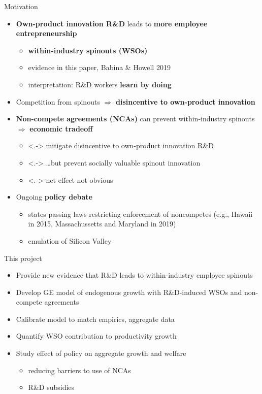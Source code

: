\documentclass[english,usenames,dvipsnames]{beamer}
\begin{document}
\begin{frame}{Motivation}\label{motivation}
\begin{itemize}
	\item<+-> \alert{\textbf{Own-product innovation R\&D}} leads to \alert{\textbf{more employee entrepreneurship}}
	\begin{itemize}
		\item \alert{\textbf{within-industry spinouts (WSOs)}}
		\hyperlink{spinouts_examples}{} \hyperlink{spinouts_facts_from_literature}{} 
		\item evidence in this paper, Babina \& Howell 2019
		\item interpretation: R\&D workers \alert{\textbf{learn by doing}} 
	\end{itemize}
	\smallskip
	\item<+-> Competition from spinouts $\Rightarrow$ \alert{\textbf{disincentive to own-product innovation}}
	\smallskip
	\item<+-> \alert{\textbf{Non-compete agreements (NCAs)}} can prevent within-industry spinouts $\Rightarrow$ \alert{\textbf{economic tradeoff}}
	\begin{itemize}
		\item<.-> mitigate disincentive to own-product innovation R\&D
		\item<.-> \ldots but prevent socially valuable spinout innovation
		\item<.-> net effect not obvious
	\end{itemize}
	\smallskip
	\item<+-> Ongoing \alert{\textbf{policy debate}}
	\begin{itemize}
		\item states passing laws restricting enforcement of noncompetes (e.g., Hawaii in 2015, Massachussetts and Maryland in 2019) 
		\item emulation of Silicon Valley
	\end{itemize}
\end{itemize}
\end{frame}

\begin{frame}{This project}
\begin{itemize}
	\item Provide new evidence that R\&D leads to within-industry employee spinouts
	\smallskip
	\item Develop GE model of endogenous growth with R\&D-induced WSOs and non-compete agreements
	\smallskip
	\item Calibrate model to match empirics, aggregate data
	\smallskip
	\item Quantify WSO contribution to productivity growth
	\smallskip
	\item Study effect of policy on aggregate growth and welfare
	\begin{itemize}
		\item reducing barriers to use of NCAs
		\item R\&D subsidies
	\end{itemize}
\end{itemize}
\end{frame}
\end{document}

